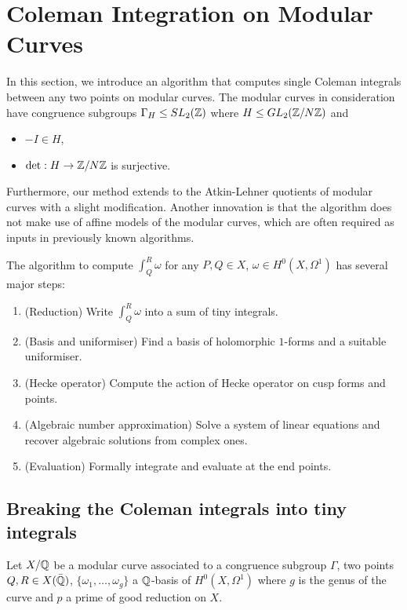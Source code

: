 \chapter{Coleman Integration on Modular Curves}

In this section, we introduce an algorithm that computes single Coleman integrals between any two points on modular curves. The modular curves in consideration have congruence subgroups $\Gamma_H \leq SL_2(\mathbb{Z})$ where $H \leq GL_2(\mathbb{Z}/N\mathbb{Z})$ and

\begin{itemize}
    \item $-I \in H$,
    \item $\det: H \rightarrow \mathbb{Z}/N\mathbb{Z}$ is surjective.
\end{itemize}

Furthermore, our method extends to the Atkin-Lehner quotients of modular curves with a slight modification. Another innovation is that the algorithm does not make use of affine models of the modular curves, which are often required as inputs in previously known algorithms. 

The algorithm to compute $\int_Q^R \omega$ for any $P,Q \in X$, $\omega \in H^0(X, \Omega^1)$ has several major steps:

\begin{enumerate}
    \item (Reduction) Write $\int_Q^R \omega$ into a sum of tiny integrals.
    \item (Basis and uniformiser) Find a basis of holomorphic $1$-forms and a suitable uniformiser.
    \item (Hecke operator) Compute the action of Hecke operator on cusp forms and points.
    \item (Algebraic number approximation) Solve a system of linear equations and recover algebraic solutions from complex ones.
    \item (Evaluation) Formally integrate and evaluate at the end points.
\end{enumerate}


\section{Breaking the Coleman integrals into tiny integrals}

Let $X/\mathbb{Q}$ be a modular curve associated to a congruence subgroup $\Gamma$, two points $Q,R \in X(\bar{\mathbb{Q}})$, $\{\omega_1, \ldots, \omega_g\}$ a $\mathbb{Q}$-basis of $H^0(X,\Omega^1)$ where $g$ is the genus of the curve and $p$ a prime of good reduction on $X$.

